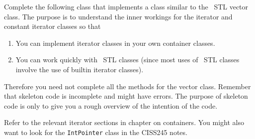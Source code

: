 Complete the following class that implements a class similar to
the \cpp\ STL vector class.
The purpose is to understand the inner workings for the iterator
and constant iterator classes so that
\begin{enumerate}[nosep]
\item You can implement iterator classes in your own container classes.
\item You can work quickly with \cpp\ STL classes (since most uses of \cpp\ STL classes involve the use of builtin iterator classes).
\end{enumerate}
Therefore you need not complete all the methods for the vector
class. 
Remember that skeleton code is incomplete and might have errors.
The purpose of skeleton code is only to give you a rough
overview of the intention of the code.

Refer to the relevant iterator sections in chapter on containers.
You might also want to look for the \verb!IntPointer! class
in the CISS245 notes.


